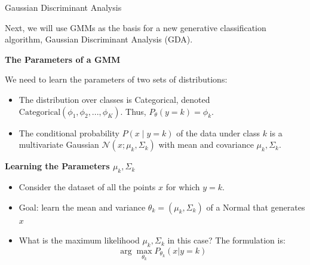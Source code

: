 \documentclass[../../generative_classifiers.tex]{subfiles}
\begin{document}
\begin{frame}[fragile]{Gaussian Discriminant Analysis}

Next, we will use GMMs as the basis for a new generative classification algorithm, Gaussian Discriminant Analysis (GDA).
\vspace{0.3cm}

\textbf{The Parameters of a GMM}

We need to learn the parameters of two sets of distributions:
\begin{itemize}
    \item The distribution over classes is Categorical, denoted $\text{Categorical}(\phi_1, \phi_2, ..., \phi_K)$. Thus, $P_\theta(y=k) = \phi_k$.
    \item The conditional probability $P(x\mid y=k)$ of the data under class $k$ is a multivariate Gaussian $\mathcal{N}(x; \mu_k, \Sigma_k)$ with mean and covariance $\mu_k, \Sigma_k$.
\end{itemize}

\vspace{0.3cm}
\textbf{Learning the Parameters $\mu_k, \Sigma_k$}

\begin{itemize}
    \item Consider the dataset of all the points $x$ for which $y=k$.
    \item Goal: learn the mean and variance $\theta_k=(\mu_k, \Sigma_k)$ of a Normal that generates $x$
    \item What is the maximum likelihood $\mu_k, \Sigma_k$ in this case? The formulation is: $$\arg\max_{\theta_k} P_{\theta_k}(x|y=k)$$
\end{itemize}
\end{frame}
\end{document}
